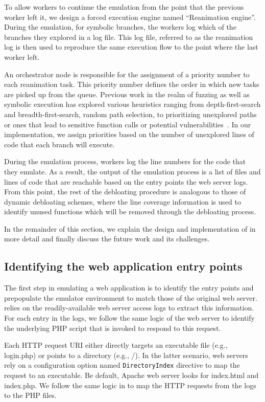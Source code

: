 To allow workers to continue the emulation from the point that the previous worker left it, we design a forced execution engine named ``Reanimation engine''. 
During the emulation, for symbolic branches, the workers log which of the branches they explored in a log file. 
This log file, referred to as the reanimation log is then used to reproduce the same execution flow to the point where the last worker left. 

An orchestrator node is responsible for the assignment of a priority number to each reanimation task. 
This priority number defines the order in which new tasks are picked up from the queue. 
Previous work in the realm of fuzzing as well as symbolic execution has explored various heuristics ranging from depth-first-search and breadth-first-search, random path selection, to prioritizing unexplored paths or ones that lead to sensitive function calls or potential vulnerabilities~\cite{cadar2008klee, cadar2008exe, cha2012unleashing, chipounov2011s2e}. 
In our implementation, we assign priorities based on the number of unexplored lines of code that each branch will execute. 

During the emulation process, workers log the line numbers for the code that they emulate. 
As a result, the output of the emulation process is a list of files and lines of code that are reachable based on the entry points the web server logs. 
From this point, the rest of the debloating procedure is analogous to those of dynamic debloating schemes, where the line coverage information is used to identify unused functions which will be removed through the debloating process. 

In the remainder of this section, we explain the design and implementation of \animatedead{} in more detail and finally discuss the future work and its challenges. 

\subsection{Identifying the web application entry points}
The first step in emulating a web application is to identify the entry points and prepopulate the emulator environment to match those of the original web server. 
\animatedead{} relies on the readily-available web server access logs to extract this information. 
For each entry in the logs, we follow the same logic of the web server to identify the underlying PHP script that is invoked to respond to this request. 

Each HTTP request URI either directly targets an executable file (e.g., login.php) or points to a directory (e.g., /). 
In the latter scenario, web servers rely on a configuration option named \texttt{DirectoryIndex} directive to map the request to an executable. 
Be default, Apache web server looks for index.html and index.php. 
We follow the same logic in \animatedead{} to map the HTTP requests from the logs to the PHP files. 


